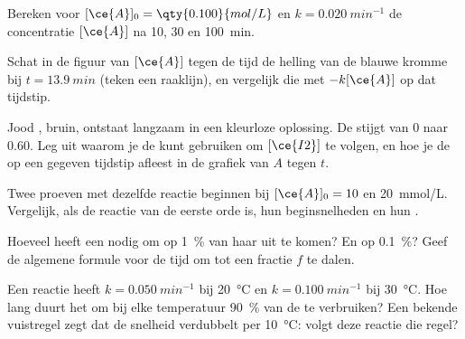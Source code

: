 \begin{exercise}[$\star\star$]\label{exo:g12:reaction-rates:8}
Bereken voor $[\ce{A}]_0 = \qty{0.100}{mol/L}$ en
$k = \qty{0.020}{min^{-1}}$ de concentratie $[\ce{A}]$ na 10, 30 en
\qty{100}{min}.
\end{exercise}

\begin{exercise}[$\star\star$]\label{exo:g12:reaction-rates:9}
Schat in de figuur van $[\ce{A}]$ tegen de tijd de helling van de blauwe
kromme bij $t = \qty{13.9}{min}$ (teken een raaklijn), en vergelijk die
met $-k[\ce{A}]$ op dat tijdstip.
\end{exercise}

\begin{exercise}[$\star\star$]\label{exo:g12:reaction-rates:10}
Jood , bruin, ontstaat langzaam in een kleurloze oplossing. De
 stijgt van 0 naar 0.60. Leg uit waarom je de  kunt
gebruiken om $[\ce{I2}]$ te volgen, en hoe je de  op een
gegeven tijdstip afleest in de grafiek van $A$ tegen $t$.
\end{exercise}

\begin{exercise}[$\star\star$]\label{exo:g12:reaction-rates:11}
Twee proeven met dezelfde reactie beginnen bij $[\ce{A}]_0 = 10$ en
\qty{20}{mmol/L}. Vergelijk, als de reactie van de eerste orde is, hun
beginsnelheden en hun .
\end{exercise}

\begin{exercise}[$\star\star\star$]\label{exo:g12:reaction-rates:12}
Hoeveel  heeft een  nodig om op
\qty{1}{\percent} van haar  uit te komen? En op
\qty{0.1}{\percent}? Geef de algemene formule voor de tijd om tot een
fractie $f$ te dalen.
\end{exercise}

\begin{exercise}[$\star\star\star$]\label{exo:g12:reaction-rates:13}
Een reactie heeft $k = \qty{0.050}{min^{-1}}$ bij \qty{20}{\celsius} en
$k = \qty{0.100}{min^{-1}}$ bij \qty{30}{\celsius}. Hoe lang duurt het
om bij elke temperatuur \qty{90}{\percent} van de  te
verbruiken? Een bekende vuistregel zegt dat de snelheid verdubbelt per
\qty{10}{\celsius}: volgt deze reactie die regel?
\end{exercise}

